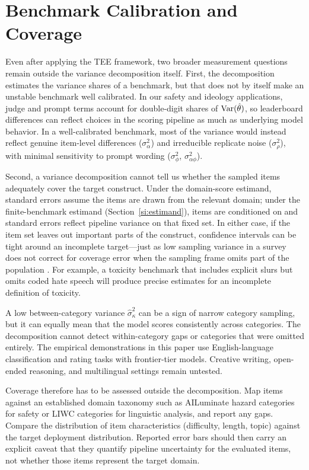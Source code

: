 \clearpage

\section{Benchmark Calibration and Coverage}
\label{si:coverage}

Even after applying the TEE framework, two broader measurement questions remain outside the variance decomposition itself. First, the decomposition estimates the variance shares of a benchmark, but that does not by itself make an unstable benchmark well calibrated. In our safety and ideology applications, judge and prompt terms account for double-digit shares of $\operatorname{Var}(\hat\theta)$, so leaderboard differences can reflect choices in the scoring pipeline as much as underlying model behavior. In a well-calibrated benchmark, most of the variance would instead reflect genuine item-level differences ($\sigma^2_\alpha$) and irreducible replicate noise ($\sigma^2_\rho$), with minimal sensitivity to prompt wording ($\sigma^2_\phi$, $\sigma^2_{\alpha\phi}$).

Second, a variance decomposition cannot tell us whether the sampled items adequately cover the target construct. Under the domain-score estimand, standard errors assume the items are drawn from the relevant domain; under the finite-benchmark estimand (Section~\ref{si:estimand}), items are conditioned on and standard errors reflect pipeline variance on that fixed set. In either case, if the item set leaves out important parts of the construct, confidence intervals can be tight around an incomplete target—just as low sampling variance in a survey does not correct for coverage error when the sampling frame omits part of the population \citep{sen2019tedon}. For example, a toxicity benchmark that includes explicit slurs but omits coded hate speech will produce precise estimates for an incomplete definition of toxicity.

A low between-category variance $\hat{\sigma}^2_\kappa$ can be a sign of narrow category sampling, but it can equally mean that the model scores consistently across categories. The decomposition cannot detect within-category gaps or categories that were omitted entirely. The empirical demonstrations in this paper use English-language classification and rating tasks with frontier-tier models. Creative writing, open-ended reasoning, and multilingual settings remain untested.

Coverage therefore has to be assessed outside the decomposition. Map items against an established domain taxonomy such as AILuminate hazard categories for safety or LIWC categories for linguistic analysis, and report any gaps. Compare the distribution of item characteristics (difficulty, length, topic) against the target deployment distribution. Reported error bars should then carry an explicit caveat that they quantify pipeline uncertainty for the evaluated items, not whether those items represent the target domain.



